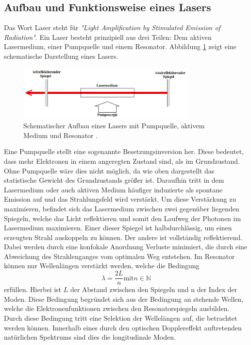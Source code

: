 \subsection{Aufbau und Funktionsweise eines Lasers}
Das Wort Laser steht für \textit{"Light Amplification by Stimulated Emission of
Radiation"}. Ein Laser besteht prinzipiell aus drei Teilen:
Dem aktiven Lasermedium, einer Pumpquelle und einem Resonator.
Abbildung \ref{pic:laser} zeigt eine schematische Darstellung eines Lasers.
\begin{figure}[htb]
  \centering
  \includegraphics[width=0.8\textwidth]{content/prinzip_laser.png}
  \caption{Schematischer Aufbau eines Lasers mit Pumpquelle, aktivem Medium und Resonator \cite{anleitung}.}
  \label{pic:laser}
\end{figure}
Eine Pumpquelle stellt eine sogenannte Besetzungsinversion her.
Diese bedeutet, dass mehr Elektronen in einem angeregten Zustand sind, als
im Grundzustand. Ohne Pumpquelle wäre dies nicht möglich, da wie oben
dargestellt das statistische Gewicht des Grundzustands größer ist.
Daraufhin tritt in dem Lasermedium oder auch aktiven Medium häufiger
induzierte als spontane Emission auf und das
Strahlungsfeld wird verstärkt.
Um diese Verstärkung zu maximieren, befindet sich das Lasermedium zwischen
zwei gegenüber liegenden Spiegeln, welche das Licht reflektieren und somit
den Laufweg der Photonen im Lasermedium maximieren.
Einer dieser Spiegel ist halbdurchlässig,
um einen erzeugten Strahl auskoppeln zu können. Der andere ist vollständig reflektierend.
Dabei werden durch eine konfokale Anordnung Verluste minimiert,
die durch eine Abweichung des Strahlenganges vom optimalen Weg entstehen.
Im Resonator können nur Wellenlängen verstärkt werden, welche die Bedingung
\begin{equation}
  \lambda = \frac{2L}{n} \text{mit} n\in\mathds{N}
\end{equation}
erfüllen.
Hierbei ist $L$ der Abstand zwischen den Spiegeln und n der Index der Moden.
Diese Bedingung begründet sich aus der Bedingung an stehende Wellen,
welche die Elektronenfunktionen zwischen den Resonatorspiegeln ausbilden.
Durch diese Bedingung tritt eine Selektion der Wellelängen auf, die betrachtet werden können.
Innerhalb eines durch den optischen Dopplereffekt auftretenden natürlichen Spektrums
sind dies die longitudinale Moden.


